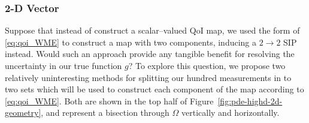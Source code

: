 \subsubsection{2-D Vector}

Suppose that instead of construct a scalar--valued QoI map, we used the form of \eqref{eq:qoi_WME} to construct a map with two components, inducing a $2 \rightarrow 2$ SIP instead.
Would such an approach provide any tangible benefit for resolving the uncertainty in our true function $g$?
To explore this question, we propose two relatively uninteresting methods for splitting our hundred measurements in to two sets which will be used to construct each component of the map according to \eqref{eq:qoi_WME}.
Both are shown in the top half of Figure~\ref{fig:pde-highd-2d-geometry}, and represent a bisection through $\Omega$ vertically and horizontally.

